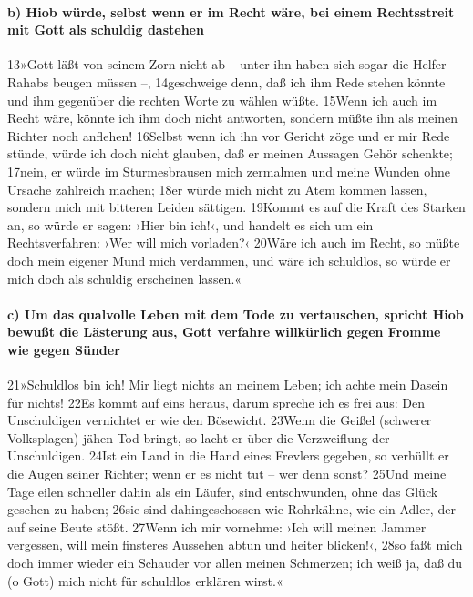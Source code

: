 \hypertarget{b-hiob-wuxfcrde-selbst-wenn-er-im-recht-wuxe4re-bei-einem-rechtsstreit-mit-gott-als-schuldig-dastehen}{%
\paragraph{b) Hiob würde, selbst wenn er im Recht wäre, bei einem
Rechtsstreit mit Gott als schuldig
dastehen}\label{b-hiob-wuxfcrde-selbst-wenn-er-im-recht-wuxe4re-bei-einem-rechtsstreit-mit-gott-als-schuldig-dastehen}}

13»Gott läßt von seinem Zorn nicht ab -- unter ihn haben sich sogar die
Helfer Rahabs beugen müssen --, 14geschweige denn, daß ich ihm Rede
stehen könnte und ihm gegenüber die rechten Worte zu wählen wüßte.
15Wenn ich auch im Recht wäre, könnte ich ihm doch nicht antworten,
sondern müßte ihn als meinen Richter noch anflehen! 16Selbst wenn ich
ihn vor Gericht zöge und er mir Rede stünde, würde ich doch nicht
glauben, daß er meinen Aussagen Gehör schenkte; 17nein, er würde im
Sturmesbrausen mich zermalmen und meine Wunden ohne Ursache zahlreich
machen; 18er würde mich nicht zu Atem kommen lassen, sondern mich mit
bitteren Leiden sättigen. 19Kommt es auf die Kraft des Starken an, so
würde er sagen: ›Hier bin ich!‹, und handelt es sich um ein
Rechtsverfahren: ›Wer will mich vorladen?‹ 20Wäre ich auch im Recht, so
müßte doch mein eigener Mund mich verdammen, und wäre ich schuldlos, so
würde er mich doch als schuldig erscheinen lassen.«

\hypertarget{c-um-das-qualvolle-leben-mit-dem-tode-zu-vertauschen-spricht-hiob-bewuuxdft-die-luxe4sterung-aus-gott-verfahre-willkuxfcrlich-gegen-fromme-wie-gegen-suxfcnder}{%
\paragraph{c) Um das qualvolle Leben mit dem Tode zu vertauschen,
spricht Hiob bewußt die Lästerung aus, Gott verfahre willkürlich gegen
Fromme wie gegen
Sünder}\label{c-um-das-qualvolle-leben-mit-dem-tode-zu-vertauschen-spricht-hiob-bewuuxdft-die-luxe4sterung-aus-gott-verfahre-willkuxfcrlich-gegen-fromme-wie-gegen-suxfcnder}}

21»Schuldlos bin ich! Mir liegt nichts an meinem Leben; ich achte mein
Dasein für nichts! 22Es kommt auf eins heraus, darum spreche ich es frei
aus: Den Unschuldigen vernichtet er wie den Bösewicht. 23Wenn die Geißel
(schwerer Volksplagen) jähen Tod bringt, so lacht er über die
Verzweiflung der Unschuldigen. 24Ist ein Land in die Hand eines Frevlers
gegeben, so verhüllt er die Augen seiner Richter; wenn er es nicht tut
-- wer denn sonst? 25Und meine Tage eilen schneller dahin als ein
Läufer, sind entschwunden, ohne das Glück gesehen zu haben; 26sie sind
dahingeschossen wie Rohrkähne, wie ein Adler, der auf seine Beute stößt.
27Wenn ich mir vornehme: ›Ich will meinen Jammer vergessen, will mein
finsteres Aussehen abtun und heiter blicken!‹, 28so faßt mich doch immer
wieder ein Schauder vor allen meinen Schmerzen; ich weiß ja, daß du (o
Gott) mich nicht für schuldlos erklären wirst.«

